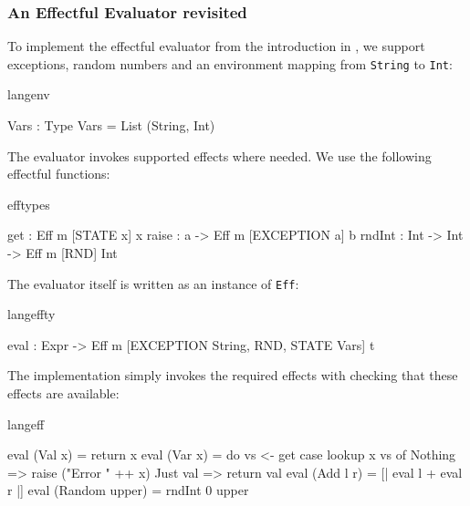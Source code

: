 \subsubsection{An Effectful Evaluator revisited}

To implement the effectful evaluator from the introduction 
in \Eff{}, we support exceptions, random numbers and an environment
mapping from \texttt{String} to \texttt{Int}:

\begin{SaveVerbatim}{langenv}

Vars : Type
Vars = List (String, Int)

\end{SaveVerbatim}

\noindent
The evaluator invokes supported effects where needed. We use the following
effectful functions:

\begin{SaveVerbatim}{efftypes}

get    : Eff m [STATE x] x
raise  : a -> Eff m [EXCEPTION a] b
rndInt : Int -> Int -> Eff m [RND] Int

\end{SaveVerbatim}

\noindent
The evaluator itself is written as an instance of \texttt{Eff}:

\begin{SaveVerbatim}{langeffty}

eval : Expr -> 
       Eff m [EXCEPTION String, RND, STATE Vars] t

\end{SaveVerbatim}

\noindent
The implementation simply invokes the required effects 
with \Eff{} checking that these effects are available:

\begin{SaveVerbatim}{langeff}

eval (Val x) = return x
eval (Var x) = do vs <- get
                  case lookup x vs of
                    Nothing => raise ("Error " ++ x)
                    Just val => return val
eval (Add l r) = [| eval l + eval r |]
eval (Random upper) = rndInt 0 upper

\end{SaveVerbatim}

